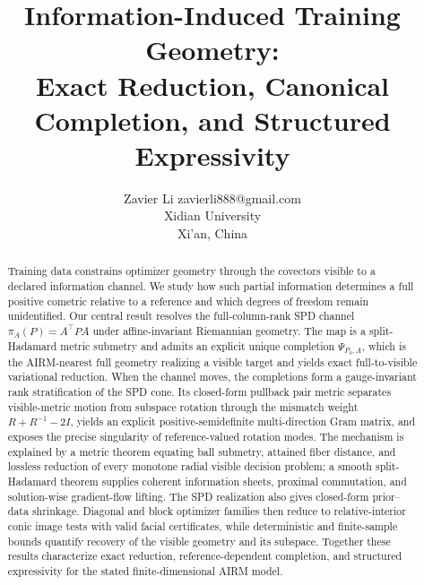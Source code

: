 \documentclass[10pt]{article}
\title{Information-Induced Training Geometry:\\
Exact Reduction, Canonical Completion, and Structured Expressivity}
\author{\name Zavier Li \email zavierli888@gmail.com\\
      \addr Xidian University\\
      \addr Xi'an, China}
\begin{document}
\maketitle

\begin{abstract}
Training data constrains optimizer geometry through the covectors visible to
a declared information channel.  We study how such partial information
determines a full positive cometric relative to a reference and which degrees
of freedom remain unidentified.  Our central result resolves the
full-column-rank SPD channel
\(\pi_A(P)=A^\top P A\) under affine-invariant Riemannian geometry.  The map
is a split-Hadamard metric submetry and admits an explicit unique completion
\(\Psi_{P_0,A}\), which is the AIRM-nearest full geometry realizing a visible
target and yields exact full-to-visible variational reduction.  When the
channel moves, the completions form a gauge-invariant rank stratification of
the SPD cone.  Its closed-form pullback pair metric separates visible-metric
motion from subspace rotation through the mismatch weight
\(R+R^{-1}-2I\), yields an explicit positive-semidefinite multi-direction Gram
matrix, and exposes the precise singularity of reference-valued rotation
modes.  The
mechanism is explained by a metric theorem equating ball
submetry, attained fiber distance, and lossless reduction of every monotone
radial visible decision problem; a smooth split-Hadamard theorem supplies
coherent information sheets, proximal commutation, and solution-wise
gradient-flow lifting.  The SPD realization also gives closed-form
prior--data shrinkage.  Diagonal
and block optimizer families then reduce to relative-interior conic image
tests with valid facial certificates, while deterministic and finite-sample
bounds quantify recovery of the visible geometry and its subspace.  Together
these results characterize exact reduction, reference-dependent completion,
and structured expressivity for the stated finite-dimensional AIRM model.
\end{abstract}















\appendix





\end{document}
